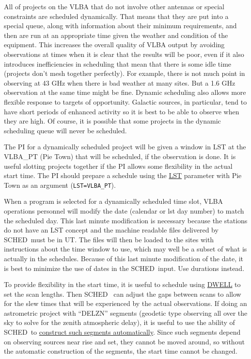 \documentclass{report}
\newcommand{\schedb}{{\sc SCHED~}}
\begin{document}
All of projects on the VLBA that do not involve other antennas or special
constraints are scheduled dynamically.
That means that they are put into a special queue, along with information
about their minimum requirements, and then are run at an appropriate
time given the weather and condition of the equipment.  This
increases the overall quality of VLBA output by avoiding observations
at times when it is clear that the results will be poor, even if it
also introduces inefficiencies in scheduling that mean that there is
some idle time (projects don't mesh together perfectly).  For example,
there is not much point in observing at 43 GHz when there is bad weather
at many sites.  But a 1.6 GHz observation at the same time might be fine.
Dynamic scheduling also allows more flexible response to targets of
opportunity.  Galactic sources, in particular, tend to have short
periods of enhanced activity so it is best to be able to observe when
they are high.  Of course, it is possible that some projects in the
dynamic scheduling queue will never be scheduled.

The PI for a dynamically scheduled project will be given a window in
LST at the VLBA\_PT (Pie Town) that will be scheduled, if the
observation is done.  It is useful slotting projects together if the
PI allows some flexibility in the actual start time.  The PI should
prepare a schedule using the 
{\hyperref[MP:LST]{LST}} parameter with Pie
Town as an argument ({\tt LST=VLBA\_PT}).

When a program is selected for a dynamically scheduled time slot,
VLBA operations personnel will modify the date (calendar or lst day
number) to match the scheduled day.  This last minute modification
is necessary because the stations do not have an LST concept and
the machine readable files delivered by \schedb must be in UT.
The files will then be loaded to the sites with instructions about
the time window to use, which may well be a subset of what is
actually in the schedules.  Because of this last minute modification
of the date, it is best to minimize the use of dates in the
\schedb input.  Use durations instead.

To provide flexibility in the start time, it is useful to schedule
using 
{\hyperref[MP:DWELL]{DWELL}} to set the scan lengths.  Then \schedb
can adjust the gaps between scans to allow for the slew times that
will be experienced by the actual observations.  If doing an
astrometric project with ``DELZN'' segments (geodetic type observing
all over the sky to solve for the zenith atmospheric delay), it is
useful to use the ability of \schedb to 
{\hyperref[SEC:GEOSEG]{construct such segments automatically}}.
Since such segments depend on
observing sources near rise and set, they cannot be moved around, so
without the automatic construction of the segments, the start time
cannot be changed.
\end{document}
